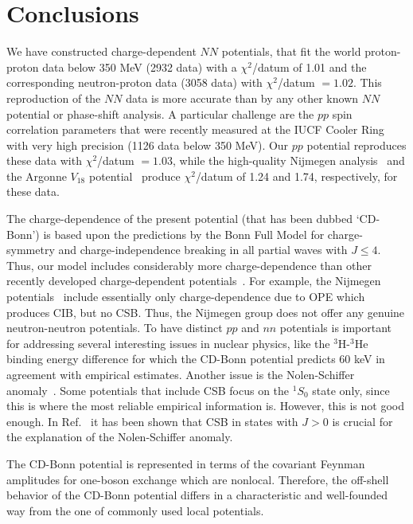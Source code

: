 \section{Conclusions}

We have constructed charge-dependent $NN$ potentials,
that fit the world proton-proton data below 350 MeV
(2932 data) with a $\chi^2$/datum of 1.01 and the
corresponding neutron-proton data (3058 data) with 
$\chi^2$/datum $= 1.02$.
This reproduction of the $NN$ data is more accurate than by any
other known $NN$ potential or phase-shift analysis.
A particular challenge are the $pp$ spin correlation parameters
that were recently measured at the IUCF Cooler Ring with
very high precision (1126 data below 350 MeV).
Our $pp$ potential reproduces these data with
$\chi^2$/datum $= 1.03$, while the high-quality Nijmegen 
analysis~\cite{Sto93} and the Argonne $V_{18}$ potential~\cite{WSS95} 
produce $\chi^2$/datum of 1.24  and 1.74, respectively, for these data.


The charge-dependence of the present potential (that has been dubbed
`CD-Bonn') is based upon the predictions by the Bonn Full Model
for charge-symmetry and charge-independence breaking in all partial
waves with $J\leq 4$. 
Thus, our model includes considerably more charge-dependence than
other recently developed charge-dependent potentials~\cite{Sto94,WSS95}.
For example, the Nijmegen potentials~\cite{Sto94} include essentially only
charge-dependence due to OPE which produces CIB, but
no CSB. Thus, the Nijmegen group does not offer any genuine 
neutron-neutron potentials.
To have distinct $pp$ and $nn$ potentials 
is important for addressing several interesting issues
in nuclear physics, like the $^3$H-$^3$He binding energy difference
for which the CD-Bonn potential predicts 60 keV 
in agreement with empirical estimates.
Another issue is the Nolen-Schiffer anomaly~\cite{NS69}.
Some potentials that include CSB focus on the $^1S_0$ state only, since 
this is where the most reliable empirical information is.
However, this is not good enough.
In Ref.~\cite{MPM99} it has been shown that CSB in
states with $J>0$ is crucial for the explanation
of the Nolen-Schiffer anomaly.


The CD-Bonn potential is represented in terms of the covariant
Feynman amplitudes for one-boson exchange which are nonlocal.
Therefore, the off-shell behavior of the CD-Bonn potential
differs in a characteristic and well-founded way from the one
of commonly used local potentials.


